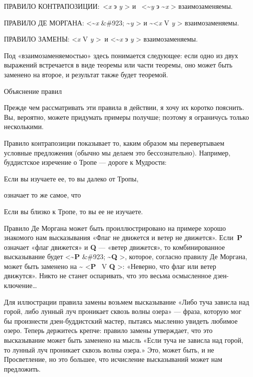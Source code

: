 ПРАВИЛО КОНТРАПОЗИЦИИ:~\textless{}\emph{x} э \emph{y} \textgreater{} и~ \textless\textasciitilde{}\emph{y} э \textasciitilde{}\emph{x} \textgreater{} взаимозаменяемы.

ПРАВИЛО ДЕ МОРГАНА: \textless\textasciitilde{}\emph{x} \&\#923; \textasciitilde{}\emph{y} \textgreater{} и \textasciitilde\textless{}\emph{x} V \emph{y} \textgreater{} взаимозаменяемы.

ПРАВИЛО ЗАМЕНЫ: \textless{}\emph{x} V \emph{y} \textgreater~и \textless\textasciitilde{}\emph{x} э \emph{y} \textgreater{} взаимозаменяемы.

Под «взаимозаменяемостью» здесь понимается следующее: если одно из двух выражений встречается в виде теоремы или части теоремы, оно может быть заменено на второе, и результат также будет теоремой.

Объяснение правил

Прежде чем рассматривать эти правила в действии, я хочу их коротко пояснить. Вы, вероятно, можете придумать примеры получше; поэтому я ограничусь только несколькими.

Правило контрапозиции показывает то, каким образом мы перевертываем условные предложения (обычно мы делаем это бессознательно). Например, буддистское изречение о Тропе --- дороге к Мудрости:

Если вы изучаете ее, то вы далеко от Тропы,

означает то же самое, что

Если вы близко к Тропе, то вы ее не изучаете.

Правило Де Моргана может быть проиллюстрировано на примере хорошо знакомого нам высказывания «Флаг не движется и ветер не движется». Если~\textbf{P} означает «флаг движется» и \textbf{Q} --- «ветер движется», то комбинированное высказывание будет \textless{}\textbf{\textasciitilde P} \&\#923; \textbf{\textasciitilde Q} \textgreater, которое, согласно правилу Де Моргана, может быть заменено на \textbf{\textasciitilde{}} \textless{}\textbf{P} ~V \textbf{Q} \textgreater: «Неверно, что флаг или ветер движутся». Никто не станет оспаривать, что это весьма осмысленное дзен-ключение\ldots{}

Для иллюстрации правила замены возьмем высказывание «Либо туча зависла над горой, либо лунный луч проникает сквозь волны озера» --- фраза, которую мог бы произнести дзен-буддистский мастер, пытаясь мысленно увидеть любимое озеро. Теперь держитесь крепче: правило замены утверждает, что это высказывание может быть заменено на мысль «Если туча не зависла над горой, то лунный луч проникает сквозь волны озера.» Это, может быть, и не Просветление, но это большее, что исчисление высказываний может нам предложить.

